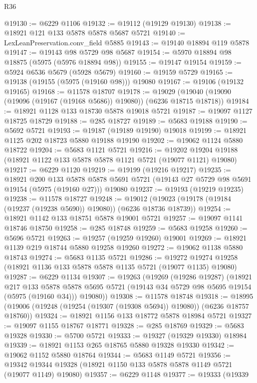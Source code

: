 \begin{lexlean}{R36}
\begin{coremodule}
@19130 := @6229 @1106
@19132 := @19112 (@19129 @19130)
@19138 := @18921 @121 @133 @5878 @5878 @5687 @5721
@19140 := LexLeanPreservation.conv_field @5885
@19143 := @19140 @18894 @119 @5878
@19147 := @19143 @98 @5729 @98 @5687
@19154 := @5970 @18894 @98 @18875 (@5975 (@5976 @18894 @98))
@19155 := @19147 @19154
@19159 := @5924 @6536 @5679 (@5928 @5679)
@19160 := @19159 @5729
@19165 := @19138 (@19155 (@5975 (@19160 @98))) @19080
@19167 := @19106 (@19132 @19165)
@19168 := @11578 @18707
@19178 := @19029 (@19040 (@19090 (@19096 (@19167 (@19168 @5686)) @19080)) (@6236 @18715 @18718))
@19184 := @18921 @1128 @133 @18730 @5878 @19018 @5721
@19187 := @19097 @1127 @18725 @18729
@19188 := @285 @18727
@19189 := @5683 @19188
@19190 := @5692 @5721
@19193 := @19187 (@19189 @19190) @19018
@19199 := @18921 @1125 @202 @18723 @5880 @19188 @19190
@19202 := @19062 @1124 @5880 @18722
@19204 := @5683 @1121 @5721
@19216 := @19202 @19204 @19188 (@18921 @1122 @133 @5878 @5878 @1121 @5721 (@19077 @1121) @19080)
@19217 := @6229 @1120
@19219 := @19199 (@19216 @19217)
@19235 := @18921
    @200
    @133
    @5878
    @5878
    @5691
    @5721
    (@19143 @27 @5729 @98 @5691 @19154 (@5975 (@19160 @27)))
    @19080
@19237 := @19193 (@19219 @19235)
@19238 := @11578 @18727
@19248 := @19012 (@19023 (@19178 (@19184 (@19237 (@19238 @5690)) @19080)) (@6236 @18736 @18739))
@19254 := @18921 @1142 @133 @18751 @5878 @19001 @5721
@19257 := @19097 @1141 @18746 @18750
@19258 := @285 @18748
@19259 := @5683 @19258
@19260 := @5696 @5721
@19263 := @19257 (@19259 @19260) @19001
@19269 := @18921 @1139 @219 @18744 @5880 @19258 @19260
@19272 := @19062 @1138 @5880 @18743
@19274 := @5683 @1135 @5721
@19286 := @19272 @19274 @19258 (@18921 @1136 @133 @5878 @5878 @1135 @5721 (@19077 @1135) @19080)
@19287 := @6229 @1134
@19307 := @19263
    (@19269
      (@19286 @19287)
      (@18921
        @217
        @133
        @5878
        @5878
        @5695
        @5721
        (@19143 @34 @5729 @98 @5695 @19154 (@5975 (@19160 @34)))
        @19080))
@19308 := @11578 @18748
@19318 := @18995 (@19006 (@19248 (@19254 (@19307 (@19308 @5694)) @19080)) (@6236 @18757 @18760))
@19324 := @18921 @1156 @133 @18772 @5878 @18984 @5721
@19327 := @19097 @1155 @18767 @18771
@19328 := @285 @18769
@19329 := @5683 @19328
@19330 := @5700 @5721
@19333 := @19327 (@19329 @19330) @18984
@19339 := @18921 @1153 @265 @18765 @5880 @19328 @19330
@19342 := @19062 @1152 @5880 @18764
@19344 := @5683 @1149 @5721
@19356 := @19342 @19344 @19328 (@18921 @1150 @133 @5878 @5878 @1149 @5721 (@19077 @1149) @19080)
@19357 := @6229 @1148
@19377 := @19333
    (@19339

\end{coremodule}
\end{lexlean}

